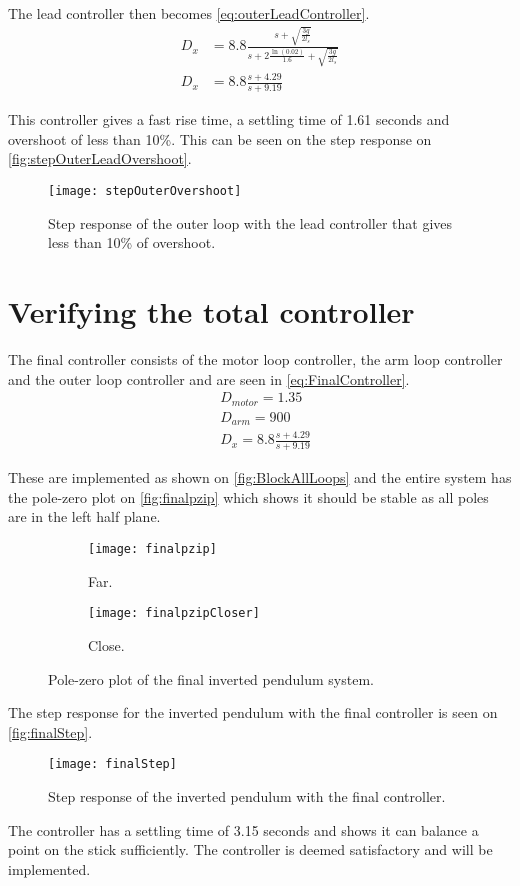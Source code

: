 The lead controller then becomes \autoref{eq:outerLeadController}.
\begin{subequations}
\begin{flalign}
D_x&=8.8\frac{s+\sqrt{\frac{3g}{2l_s}}}{s+2\frac{\ln(0.02)}{1.6}+\sqrt{\frac{3g}{2l_s}}} \\ 
D_x&=8.8\frac{s+4.29}{s+9.19} \label{eq:outerLeadController}
\end{flalign}
\end{subequations}

This controller gives a fast rise time, a settling time of 1.61 seconds and overshoot of less than 10\%. This can be seen on the step response on \autoref{fig:stepOuterLeadOvershoot}.
\begin{figure}[htbp]
\centering
\texttt{[image: stepOuterOvershoot]}
\caption{Step response of the outer loop with the lead controller that gives less than 10\% of overshoot.}
\label{fig:stepOuterLeadOvershoot}
\end{figure}
\newpage

\section{Verifying the total controller}
The final controller consists of the motor loop controller, the arm loop controller and the outer loop controller and are seen in \autoref{eq:FinalController}.
\begin{subequations}\label{eq:FinalController}
\begin{flalign}
&D_{motor}=1.35 \\
&D_{arm}=900 \\
&D_x=8.8\frac{s+4.29}{s+9.19}
\end{flalign}
\end{subequations}

These are implemented as shown on \autoref{fig:BlockAllLoops} and the entire system has the pole-zero plot on \autoref{fig:finalpzip} which shows it should be stable as all poles are in the left half plane.
\begin{figure}[htbp]
\centering
	\begin{subfigure}{0.45\textwidth}
	\texttt{[image: finalpzip]}
	\caption{Far.}
	\end{subfigure}
	\begin{subfigure}{0.45\textwidth}
	\texttt{[image: finalpzipCloser]}
	\caption{Close.}
	\end{subfigure}
\caption{Pole-zero plot of the final inverted pendulum system.}
\label{fig:finalpzip}
\end{figure}

The step response for the inverted pendulum with the final controller is seen on \autoref{fig:finalStep}.
\begin{figure}
\centering
\texttt{[image: finalStep]}
\caption{Step response of the inverted pendulum with the final controller.}
\label{fig:finalStep}
\end{figure}

The controller has a settling time of 3.15 seconds and shows it can balance a point on the stick sufficiently. The controller is deemed satisfactory and will be implemented.